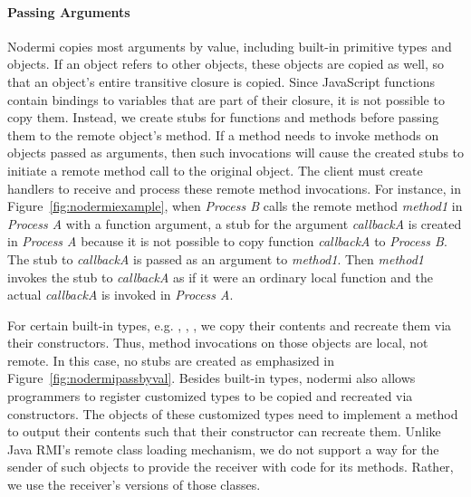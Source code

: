 \paragraph{Passing Arguments}
Nodermi copies most arguments by value, including built-in primitive types
and objects.  If an object refers to other objects, these objects are copied
as well, so that an object's entire transitive closure is copied.
Since JavaScript functions contain bindings to variables that are part of
their closure, it is not possible to copy them.
Instead, we create stubs for functions and methods before passing them
to the remote object's method.  If a method needs to invoke
methods on objects passed as arguments, then such invocations
will cause the created stubs to initiate a remote method
call to the original object.  The client must create handlers
to receive and process these remote method invocations.
For instance, in Figure~\ref{fig:nodermiexample},
when \emph{Process B} calls the remote method \emph{method1}
in \emph{Process A} with a function argument,
a stub for the argument
\emph{callbackA} is created in \emph{Process A} because
it is not possible to copy function \emph{callbackA} to \emph{Process B}.
The stub to \emph{callbackA} is passed as an argument to
 \emph{method1}.
Then \emph{method1} invokes the stub to \emph{callbackA} as if it were an ordinary
 local function and the actual \emph{callbackA} is invoked in \emph{Process A}.


\nodrmipassbyvalfig{}

For certain built-in types, e.g. , , ,
we copy their contents and recreate them via their constructors.
Thus, method invocations on those objects are local, not remote.
In this case, no stubs are created as emphasized in Figure~\ref{fig:nodermipassbyval}.
Besides built-in types, nodermi also allows programmers to
register customized types to be copied and recreated via constructors.
The objects of these customized types need to implement a method to output
their contents such that their constructor can recreate them.
Unlike Java RMI\cite{j2eedoc}'s remote class loading mechanism, we do
not support a way for the sender of such objects to provide the receiver
with code for its methods.  Rather, we use the receiver's versions of
those classes.

\nodermipassbyreffig{}

\nodermipassstubbyreffig{}

